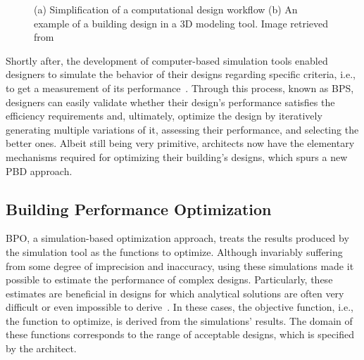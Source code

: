 \begin{figure}[htbp]
\centering
{}%
\hfill
{}%

\caption[General views of Traditional Design Approaches]{(a) Simplification of a computational design workflow (b) An example of a building design in a 3D modeling tool. Image retrieved from~\cite{3DMODELTOOL}}
\label{fig:traditionaldesign}
\end{figure}

Shortly after, the development of computer-based simulation tools enabled designers to simulate the behavior of their designs regarding specific criteria, i.e., to get a measurement of its performance~\cite{Malkawi2005}. Through this process, known as \ac{BPS}, designers can easily validate whether their design's performance satisfies the efficiency requirements and, ultimately, optimize the design by iteratively generating multiple variations of it, assessing their performance, and selecting the better ones. Albeit still being very primitive, architects now have the elementary mechanisms required for optimizing their building's designs, which spurs a new \ac{PBD} approach.

\subsection{Building Performance Optimization}

	\ac{BPO}, a simulation-based optimization approach, treats the results produced by the simulation tool as the functions to optimize. Although invariably suffering from some degree of imprecision and inaccuracy, using these simulations made it possible to estimate the performance of complex designs. Particularly, these estimates are beneficial in designs for which analytical solutions are often very difficult or even impossible to derive~\cite{Kolda2003}. In these cases, the objective function, i.e., the function to optimize, is derived from the simulations' results. The domain of these functions corresponds to the range of acceptable designs,  which is specified by the architect.

